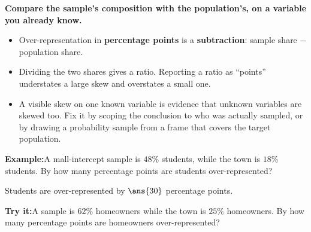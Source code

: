 \documentclass[12pt]{article}
\begin{document}
\begin{formulabox}
\textbf{Compare the sample's composition with the population's, on a variable you
already know.}
\begin{itemize}[leftmargin=0.8cm, itemsep=1pt, topsep=2pt]
  \item Over-representation in \textbf{percentage points} is a
        \textbf{subtraction}: sample share $-$ population share.
  \item Dividing the two shares gives a ratio. Reporting a ratio as ``points''
        understates a large skew and overstates a small one.
  \item A visible skew on one known variable is evidence that unknown variables
        are skewed too. Fix it by scoping the conclusion to who was actually
        sampled, or by drawing a probability sample from a frame that covers the
        target population.
\end{itemize}
\end{formulabox}

\begin{examplebox}
\textbf{Example:}\quad A mall-intercept sample is $48\%$ students, while the town
is $18\%$ students. By how many percentage points are students over-represented?



Students are over-represented by $\ans{30}$ percentage points.
\end{examplebox}

\begin{tryitbox}
\textbf{Try it:}\quad A sample is $62\%$ homeowners while the town is $25\%$
homeowners. By how many percentage points are homeowners over-represented?

\end{tryitbox}
\end{document}
